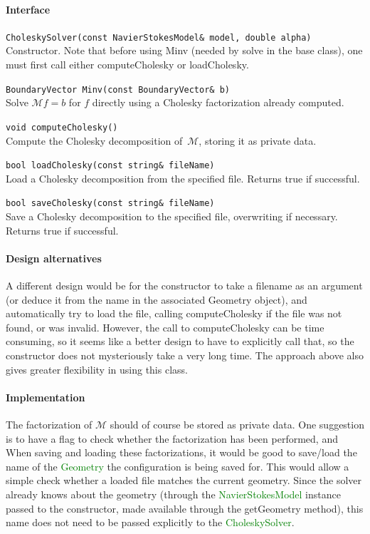 \documentclass[11pt]{article}
\def\class#1{\textcolor{green}{\ttfamily\small #1}} %
\def\fn#1{{\ttfamily\small #1}} %
\let\code\lstinline
\begin{document}
\paragraph{Interface}
\begin{description}
	\item \code|CholeskySolver(const NavierStokesModel& model, double alpha)|\\
		Constructor.  Note that before using \fn{Minv} (needed by \fn{solve} in the base class), one must first call either \fn{computeCholesky} or \fn{loadCholesky}.
	\item \code|BoundaryVector Minv(const BoundaryVector& b)|\\
		Solve $\mathcal{M}f = b$ for $f$ directly using a Cholesky factorization already computed.
	\item \code|void computeCholesky()|\\
		Compute the Cholesky decomposition of~$\mathcal{M}$, storing it as private data.
	\item \code|bool loadCholesky(const string& fileName)|\\
		Load a Cholesky decomposition from the specified file.  Returns true if successful.
	\item \code|bool saveCholesky(const string& fileName)|\\
		Save a Cholesky decomposition to the specified file, overwriting if necessary.  Returns true if successful.
\end{description}

\paragraph{Design alternatives}
A different design would be for the constructor to take a filename as an argument (or deduce it from the name in the associated Geometry object), and automatically try to load the file, calling \fn{computeCholesky} if the file was not found, or was invalid.  However, the call to \fn{computeCholesky} can be time consuming, so it seems like a better design to have to explicitly call that, so the constructor does not mysteriously take a very long time.  The approach above also gives greater flexibility in using this class.

\paragraph{Implementation}
The factorization of $\mathcal{M}$ should of course be stored as private data.  One suggestion is to have a flag to check whether the factorization has been performed, and When saving and loading these factorizations, it would be good to save/load the name of the \class{Geometry} the configuration is being saved for.  This would allow a simple check whether a loaded file matches the current geometry.  Since the solver already knows about the geometry (through the \class{NavierStokesModel} instance passed to the constructor, made available through the \fn{getGeometry} method), this name does not need to be passed explicitly to the \class{CholeskySolver}.
\end{document}
